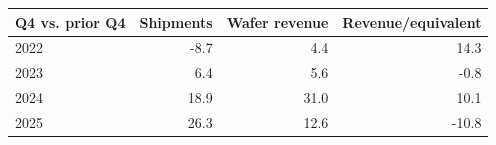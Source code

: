 \begin{tabular}{lrrr}\toprule
Q4 vs. prior Q4 & Shipments & Wafer revenue & Revenue/equivalent \\\midrule
2022 & -8.7 & 4.4 & 14.3 \\
2023 & 6.4 & 5.6 & -0.8 \\
2024 & 18.9 & 31.0 & 10.1 \\
2025 & 26.3 & 12.6 & -10.8 \\
\bottomrule\end{tabular}
